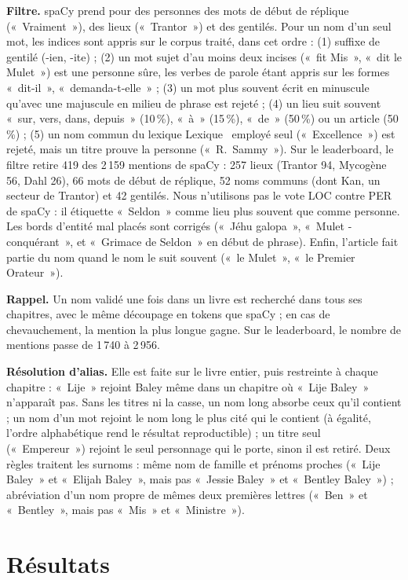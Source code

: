 \documentclass[cameraready]{Interspeech}
\begin{document}
\textbf{Filtre.} spaCy prend pour des personnes des mots de début de réplique («~Vraiment~»), des lieux
(«~Trantor~») et des gentilés. Pour un nom d'un seul mot, les indices sont appris sur le corpus traité, dans
cet ordre : (1) suffixe de gentilé (\mbox{-ien}, \mbox{-ite}) ; (2) un mot sujet d'au moins deux incises
(«~fit Mis~», «~dit le Mulet~») est une personne sûre, les verbes de parole étant appris sur les formes
«~dit-il~», «~demanda-t-elle~» ; (3) un mot plus souvent écrit en minuscule qu'avec une majuscule en milieu de
phrase est rejeté ; (4) un lieu suit souvent «~sur, vers, dans, depuis~» (10\,\%), «~à~» (15\,\%), «~de~»
(50\,\%) ou un article (50\,\%) ; (5) un nom commun du lexique Lexique~\cite{lexique} employé seul
(«~Excellence~») est rejeté, mais un titre prouve la personne («~R.~Sammy~»). Sur le leaderboard, le filtre
retire 419 des 2\,159 mentions de spaCy : 257 lieux (Trantor 94, Mycogène 56, Dahl 26), 66 mots de début de
réplique, 52 noms communs (dont Kan, un secteur de Trantor) et 42 gentilés. Nous n'utilisons pas le vote LOC
contre PER de spaCy : il étiquette «~Seldon~» comme lieu plus souvent que comme personne. Les bords d'entité mal
placés sont corrigés («~Jéhu galopa~», «~Mulet - conquérant~», et «~Grimace de Seldon~» en début de phrase).
Enfin, l'article fait partie du nom quand le nom le suit souvent («~le Mulet~», «~le Premier Orateur~»).

\textbf{Rappel.} Un nom validé une fois dans un livre est recherché dans tous ses chapitres, avec le même
découpage en tokens que spaCy ; en cas de chevauchement, la mention la plus longue gagne. Sur le leaderboard, le
nombre de mentions passe de 1\,740 à 2\,956.

\textbf{Résolution d'alias.} Elle est faite sur le livre entier, puis restreinte à chaque chapitre : «~Lije~»
rejoint Baley même dans un chapitre où «~Lije Baley~» n'apparaît pas. Sans les titres ni la casse, un nom long
absorbe ceux qu'il contient ; un nom d'un mot rejoint le nom long le plus cité qui le contient (à égalité, l'ordre
alphabétique rend le résultat reproductible) ; un titre seul («~Empereur~») rejoint le seul personnage qui le
porte, sinon il est retiré. Deux règles traitent les surnoms : même nom de famille et prénoms proches
(«~Lije Baley~» et «~Elijah Baley~», mais pas «~Jessie Baley~» et «~Bentley Baley~») ; abréviation d'un nom
propre de mêmes deux premières lettres («~Ben~» et «~Bentley~», mais pas «~Mis~» et «~Ministre~»).

\section{Résultats}
\end{document}
